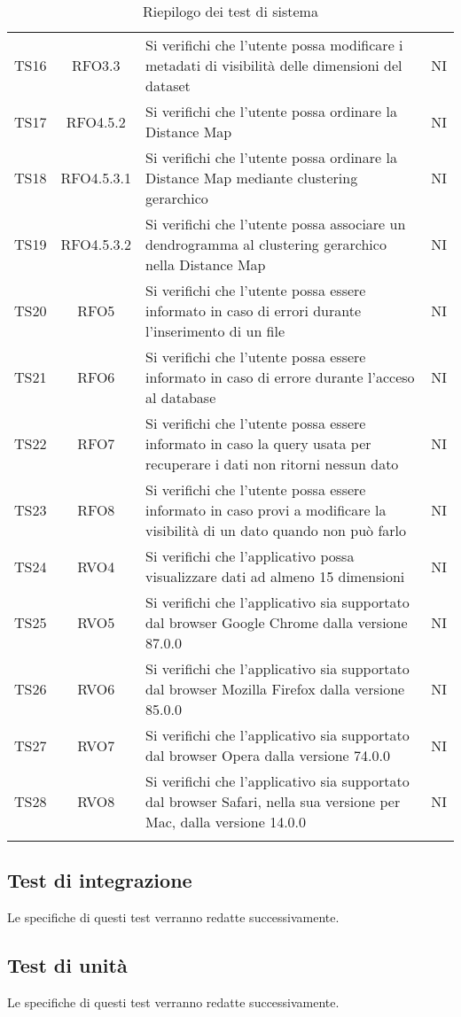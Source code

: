 \documentclass[../piano_di_qualifica.tex]{subfiles}
\begin{document}
\begin{center}
\begin{longtable}{|c|c|p{8cm}|c|}
		TS16  & RFO3.3     		& Si verifichi che l'utente possa modificare i metadati di visibilità delle dimensioni del dataset & NI \\
		TS17  & RFO4.5.2     	& Si verifichi che l'utente possa ordinare la Distance Map & NI \\
		TS18  & RFO4.5.3.1     	& Si verifichi che l'utente possa ordinare la Distance Map mediante clustering gerarchico & NI \\
		TS19  & RFO4.5.3.2   	& Si verifichi che l'utente possa associare un dendrogramma al clustering gerarchico nella Distance Map & NI \\
		TS20  & RFO5     		& Si verifichi che l'utente possa essere informato in caso di errori durante l'inserimento di un file & NI \\
		TS21  & RFO6     		& Si verifichi che l'utente possa essere informato in caso di errore durante l'acceso al database & NI \\
		TS22  & RFO7     		& Si verifichi che l'utente possa essere informato in caso la query usata per recuperare i dati non ritorni nessun dato & NI \\
		TS23  & RFO8    		& Si verifichi che l'utente possa essere informato in caso provi a modificare la visibilità di un dato quando non può farlo & NI \\
		TS24  & RVO4    		& Si verifichi che l'applicativo possa visualizzare dati ad almeno 15 dimensioni & NI \\
		TS25  & RVO5    		& Si verifichi che l'applicativo sia supportato dal browser Google Chrome dalla versione 87.0.0 & NI \\
		TS26  & RVO6        	& Si verifichi che l'applicativo sia supportato dal browser Mozilla Firefox dalla versione 85.0.0  & NI \\
		TS27  & RVO7        	& Si verifichi che l'applicativo sia supportato dal browser Opera dalla versione 74.0.0  & NI \\
		TS28  & RVO8      		& Si verifichi che l'applicativo sia supportato dal browser Safari, nella sua versione per Mac, dalla versione 14.0.0  & NI \\
		\hline
		\rowcolor{white}
		\caption{Riepilogo dei test di sistema}
	\end{longtable}

\end{center}

\subsection{Test di integrazione}%
\label{sub:test_int}
Le specifiche di questi test verranno redatte successivamente.

\subsection{Test di unità}%
\label{sub:test_unit}
Le specifiche di questi test verranno redatte successivamente.
\end{document}
